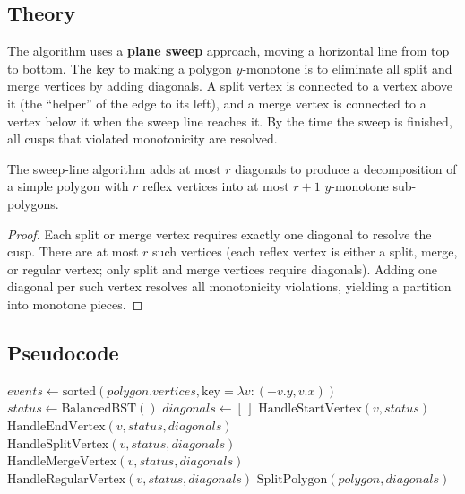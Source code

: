 \subsection{Theory}

The algorithm uses a \textbf{plane sweep} approach, moving a horizontal line from top to bottom. The key to making a polygon $y$-monotone is to eliminate all split and merge vertices by adding diagonals. A split vertex is connected to a vertex above it (the ``helper'' of the edge to its left), and a merge vertex is connected to a vertex below it when the sweep line reaches it. By the time the sweep is finished, all cusps that violated monotonicity are resolved.

\begin{theorem}\label{thm:monotone_decomp_correctness}
The sweep-line algorithm adds at most $r$ diagonals to produce a decomposition of a simple polygon with $r$ reflex vertices into at most $r + 1$ $y$-monotone sub-polygons.
\end{theorem}
\begin{proof}
Each split or merge vertex requires exactly one diagonal to resolve the cusp. There are at most $r$ such vertices (each reflex vertex is either a split, merge, or regular vertex; only split and merge vertices require diagonals). Adding one diagonal per such vertex resolves all monotonicity violations, yielding a partition into monotone pieces.
\end{proof}

\subsection{Pseudocode}

\begin{algorithm}[htbp]
\caption{Monotone Polygon Decomposition}
\label{alg:monotone_decomposition}
\begin{algorithmic}[1]
  \State $events \gets \text{sorted}(polygon.vertices, \text{key}=\lambda v: (-v.y, v.x))$
  \State $status \gets \text{BalancedBST}()$
  \State $diagonals \gets [\,]$
      \State $\text{HandleStartVertex}(v, status)$
      \State $\text{HandleEndVertex}(v, status, diagonals)$
      \State $\text{HandleSplitVertex}(v, status, diagonals)$
      \State $\text{HandleMergeVertex}(v, status, diagonals)$
    \Else
      \State $\text{HandleRegularVertex}(v, status, diagonals)$
    \EndIf
  \EndFor
  \State \Return $\text{SplitPolygon}(polygon, diagonals)$
\EndFunction
\end{algorithmic}
\end{algorithm}

